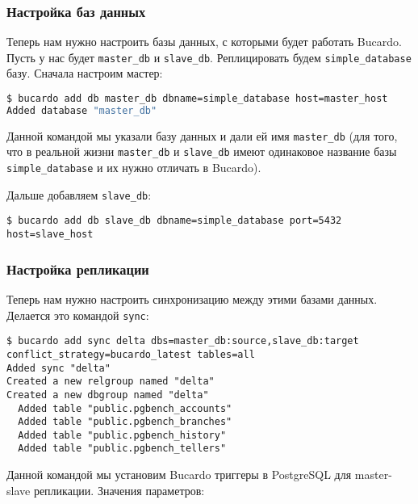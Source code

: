 \subsubsection{Настройка баз данных}

Теперь нам нужно настроить базы данных, с которыми будет работать Bucardo. Пусть у нас будет \lstinline!master_db! и \lstinline!slave_db!. Реплицировать будем \lstinline!simple_database! базу. Сначала настроим мастер:

\begin{lstlisting}[language=Bash,label=lst:bucardo7,caption=Настройка баз данных]
$ bucardo add db master_db dbname=simple_database host=master_host
Added database "master_db"
\end{lstlisting}

Данной командой мы указали базу данных и дали ей имя \lstinline!master_db! (для того, что в реальной жизни \lstinline!master_db! и \lstinline!slave_db!
имеют одинаковое название базы \lstinline!simple_database! и их нужно отличать в Bucardo).

Дальше добавляем \lstinline!slave_db!:

\begin{lstlisting}[label=lst:bucardo8,caption=Настройка баз данных]
$ bucardo add db slave_db dbname=simple_database port=5432 host=slave_host
\end{lstlisting}

\subsubsection{Настройка репликации}

Теперь нам нужно настроить синхронизацию между этими базами данных. Делается это командой \lstinline!sync!:

\begin{lstlisting}[label=lst:bucardo9,caption=Настройка репликации]
$ bucardo add sync delta dbs=master_db:source,slave_db:target conflict_strategy=bucardo_latest tables=all
Added sync "delta"
Created a new relgroup named "delta"
Created a new dbgroup named "delta"
  Added table "public.pgbench_accounts"
  Added table "public.pgbench_branches"
  Added table "public.pgbench_history"
  Added table "public.pgbench_tellers"
\end{lstlisting}

Данной командой мы установим Bucardo триггеры в PostgreSQL для master-slave репликации. Значения параметров:

